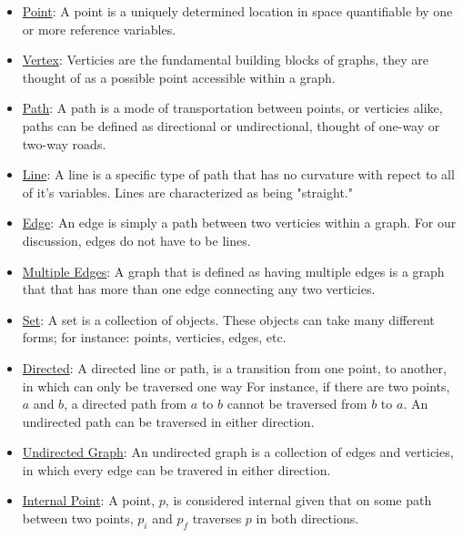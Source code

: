 \documentclass[a4paper,man,natbib]{apa6}
\begin{document}
\begin{itemize}

      \item \underline{Point}: A point is a uniquely determined location in space quantifiable by one or more reference variables. 

      \item \underline{Vertex}: Verticies are the fundamental building blocks of graphs, they are thought of as a possible point accessible within a graph.

      \item \underline{Path}: A path is a mode of transportation between points, or verticies alike, paths can be defined as directional or undirectional, thought of one-way or two-way roads.

      \item \underline{Line}: A line is a specific type of path that has no curvature with repect to all of it's variables. Lines are characterized as being "straight."

      \item \underline{Edge}: An edge is simply a path between two verticies within a graph. For our discussion, edges do not have to be lines. 

      \item \underline{Multiple Edges}: A graph that is defined as having multiple edges is a graph that that has more than one edge connecting any two verticies.
      
      \item \underline{Set}: A set is a collection of objects. These objects can take many different forms; for instance: points, verticies, edges, etc. 

      \item \underline{Directed}: A directed line or path, is a transition from one point, to another, in which can only be traversed one way
      For instance, if there are two points, $ a $ and $ b $, a directed path from $ a $ to $ b $ cannot be traversed from $ b $ to $ a $. An undirected path can be traversed in either direction. 

      \item \underline{Undirected Graph}: An undirected graph is a collection of edges and verticies, in which every edge can be travered in either direction. 

      \item \underline{Internal Point}: A point, $ p $, is considered internal given that on some path between two points, $ p_i $ and $ p_f $ traverses $ p $ in both directions. 


\end{itemize}
\end{document}
